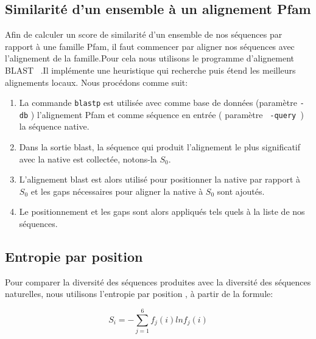 \subsection{Similarité d'un ensemble à un alignement Pfam}
\label{SimPfam}
Afin de calculer un score de similarité d'un ensemble de nos séquences par rapport à une famille Pfam, il faut commencer par aligner nos séquences avec l'alignement de la famille.Pour cela nous utilisons le programme d'alignement BLAST ~\citep{refBLAST}.Il implémente une heuristique qui recherche puis étend les meilleurs alignements locaux. Nous procédons comme suit:
\begin{enumerate}
\item La commande \verb!blastp! est utilisée avec comme base de données (paramètre \verb!-db! ) l'alignement Pfam et comme séquence en entrée ( paramètre \verb! -query !) la séquence native. 
\item Dans la sortie blast, la séquence qui produit l'alignement le plus significatif avec la native est collectée, notons-la $S_0$. 
\item L'alignement blast est alors utilisé pour positionner la native par rapport à $S_0$ et les gaps nécessaires pour aligner la native à $S_0$ sont ajoutés.
\item Le positionnement et les gaps sont alors appliqués tels quels à la liste de nos séquences.

\end{enumerate}

\subsection{Entropie par position}
\label{subsection:Entropie}
Pour comparer la diversité des séquences produites avec la diversité des séquences naturelles, nous utilisons l'entropie par position \cite{DurbinBK}, à partir de la formule:

\begin{equation} \label{eq:entropy}
  S_i = - \sum_{j=1}^6 f_j(i)lnf_j(i)
\end{equation} 



